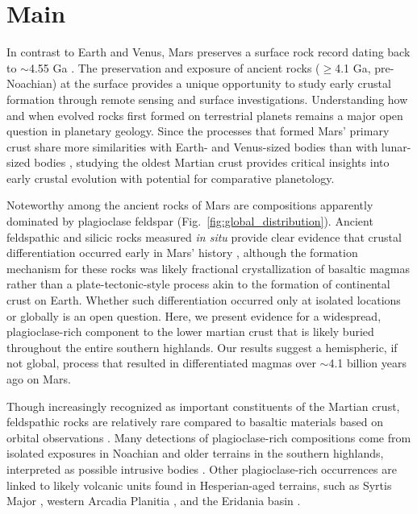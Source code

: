 \documentclass[12pt]{article}
\begin{document}
\section*{Main}
In contrast to Earth and Venus, Mars preserves a surface rock record dating back to $\sim$4.55 Ga \citep{Humayun2013, Kruijer2020}. The preservation and exposure of ancient rocks ($\geq$4.1 Ga, pre-Noachian) at the surface provides a unique opportunity to study early crustal formation through remote sensing and surface investigations. Understanding how and when evolved rocks first formed on terrestrial planets remains a major open question in planetary geology. Since the processes that formed Mars' primary crust share more similarities with Earth- and Venus-sized bodies than with lunar-sized bodies \citep{Elkins-Tanton2012}, studying the oldest Martian crust provides critical insights into early crustal evolution with potential for comparative planetology.

Noteworthy among the ancient rocks of Mars are compositions apparently dominated by plagioclase feldspar (Fig.~\ref{fig:global_distribution}). Ancient feldspathic and silicic rocks measured \textit{in situ} provide clear evidence that crustal differentiation occurred early in Mars' history \citep[e.g.,][]{Stolper2013, Sautter2015}, although the formation mechanism for these rocks was likely fractional crystallization of basaltic magmas \citep{Udry2018,Ostwald2022} rather than a plate-tectonic-style process \citep{Sautter2015,Sautter2016} akin to the formation of continental crust on Earth. Whether such differentiation occurred only at isolated locations or globally is an open question. Here, we present evidence for a widespread, plagioclase-rich component to the lower martian crust that is likely buried throughout the entire southern highlands. Our results suggest a hemispheric, if not global, process that resulted in differentiated magmas over $\sim$4.1 billion years ago on Mars.

Though increasingly recognized as important constituents of the Martian crust, feldspathic rocks are relatively rare compared to basaltic materials based on orbital observations \citep{Ehlmann2014,McSween2015, McSween2009,McSween2023}. Many detections of plagioclase-rich compositions come from isolated exposures in Noachian and older terrains in the southern highlands, interpreted as possible intrusive bodies \citep{Quantin2012, Carter2013, Wray2013, Sautter2016, Viviano-Beck2017, Payre2022}. Other plagioclase-rich occurrences are linked to likely volcanic units found in Hesperian-aged terrains, such as Syrtis Major \citep{Wray2013, Eggers2021,Rogers2022}, western Arcadia Planitia \citep{Farrand2021}, and the Eridania basin \citep{Michalski2023}.
\end{document}
